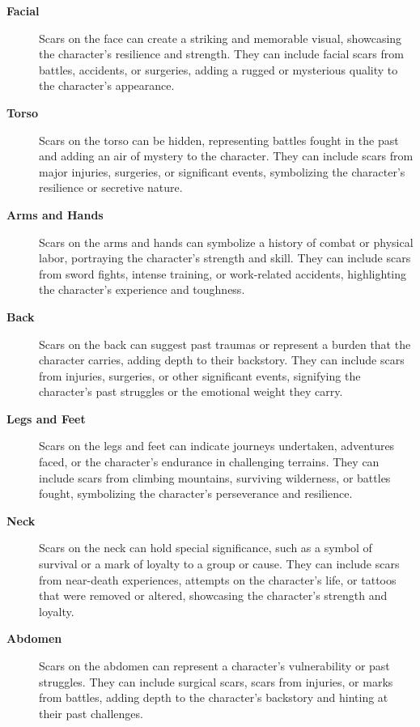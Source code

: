 \documentclass[12pt]{book}  %
\begin{document}
\begin{description}
    \item[\textbf{Facial}] Scars on the face can create a striking and memorable visual, showcasing the character's resilience and strength. They can include facial scars from battles, accidents, or surgeries, adding a rugged or mysterious quality to the character's appearance.
    
    \item[\textbf{Torso}] Scars on the torso can be hidden, representing battles fought in the past and adding an air of mystery to the character. They can include scars from major injuries, surgeries, or significant events, symbolizing the character's resilience or secretive nature.
    
    \item[\textbf{Arms and Hands}] Scars on the arms and hands can symbolize a history of combat or physical labor, portraying the character's strength and skill. They can include scars from sword fights, intense training, or work-related accidents, highlighting the character's experience and toughness.
    
    \item[\textbf{Back}] Scars on the back can suggest past traumas or represent a burden that the character carries, adding depth to their backstory. They can include scars from injuries, surgeries, or other significant events, signifying the character's past struggles or the emotional weight they carry.
    
    \item[\textbf{Legs and Feet}] Scars on the legs and feet can indicate journeys undertaken, adventures faced, or the character's endurance in challenging terrains. They can include scars from climbing mountains, surviving wilderness, or battles fought, symbolizing the character's perseverance and resilience.
    
    \item[\textbf{Neck}] Scars on the neck can hold special significance, such as a symbol of survival or a mark of loyalty to a group or cause. They can include scars from near-death experiences, attempts on the character's life, or tattoos that were removed or altered, showcasing the character's strength and loyalty.
    
    \item[\textbf{Abdomen}] Scars on the abdomen can represent a character's vulnerability or past struggles. They can include surgical scars, scars from injuries, or marks from battles, adding depth to the character's backstory and hinting at their past challenges.
\end{description}
\end{document}
